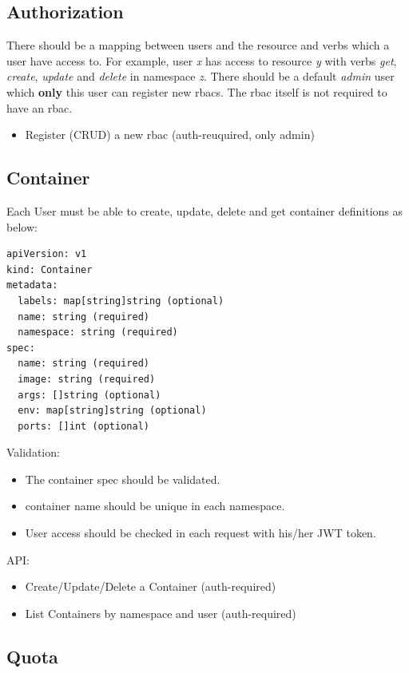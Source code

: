 \documentclass{article}
\begin{document}
\subsection{Authorization}

There should be a mapping between users and the resource and verbs which a user have access to.
For example, user \textit{x} has access to resource \textit{y} with verbs \textit{get}, \textit{create}, \textit{update} and \textit{delete} in namespace \textit{z}.
There should be a default \textit{admin} user which \textbf{only} this user can register new rbacs.
The rbac itself is not required to have an rbac.

\begin{itemize}
  \item Register (CRUD) a new rbac (auth-reuquired, only admin)
\end{itemize}

\subsection{Container}
Each User must be able to create, update, delete and get container definitions as below:

\begin{verbatim}
apiVersion: v1
kind: Container
metadata:
  labels: map[string]string (optional)
  name: string (required)
  namespace: string (required)
spec:
  name: string (required)
  image: string (required)
  args: []string (optional)
  env: map[string]string (optional)
  ports: []int (optional)
\end{verbatim}

Validation:

\begin{itemize}
  \item The container spec should be validated.
  \item container name should be unique in each namespace.
  \item User access should be checked in each request with his/her JWT token.
\end{itemize}

API:

\begin{itemize}
  \item Create/Update/Delete a Container (auth-required)
  \item List Containers by namespace and user (auth-required)
\end{itemize}

\subsection{Quota}
\end{document}
